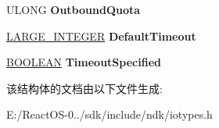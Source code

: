 \begin{DoxyCompactItemize}
U\+L\+O\+NG {\bfseries Outbound\+Quota}
\item 
\mbox{\label{struct___n_a_m_e_d___p_i_p_e___c_r_e_a_t_e___p_a_r_a_m_e_t_e_r_s_a424f6a0b44bc4265028c2308c98fea17}} 
\hyperlink{union___l_a_r_g_e___i_n_t_e_g_e_r}{L\+A\+R\+G\+E\+\_\+\+I\+N\+T\+E\+G\+ER} {\bfseries Default\+Timeout}
\item 
\mbox{\label{struct___n_a_m_e_d___p_i_p_e___c_r_e_a_t_e___p_a_r_a_m_e_t_e_r_s_ae50877f23daa7ea7da92ed72f64c6903}} 
\hyperlink{_processor_bind_8h_a112e3146cb38b6ee95e64d85842e380a}{B\+O\+O\+L\+E\+AN} {\bfseries Timeout\+Specified}
\end{DoxyCompactItemize}


该结构体的文档由以下文件生成\+:\begin{DoxyCompactItemize}
\item 
E\+:/\+React\+O\+S-\/0../sdk/include/ndk/iotypes.\+h\end{DoxyCompactItemize}
